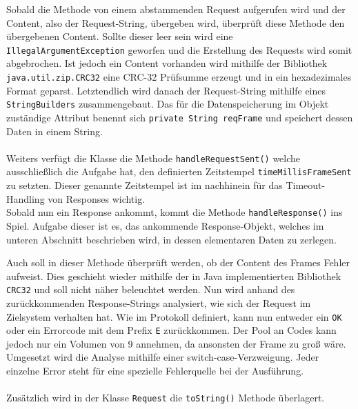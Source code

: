 Sobald die Methode von einem abstammenden Request aufgerufen wird und der Content, also der Request-String, übergeben wird, überprüft diese Methode den übergebenen Content.
Sollte dieser leer sein wird eine \lstinline[style=java]{IllegalArgumentException} geworfen und die Erstellung des Requests wird somit abgebrochen.
Ist jedoch ein Content vorhanden wird mithilfe der Bibliothek \lstinline{java.util.zip.CRC32} eine CRC-32 Prüfsumme erzeugt und in ein hexadezimales Format geparst.
Letztendlich wird danach der Request-String mithilfe eines \lstinline{StringBuilders} zusammengebaut.
Das für die Datenspeicherung im Objekt zuständige Attribut benennt sich \lstinline[style=java]{private String reqFrame} und speichert dessen Daten in einem String.\\\\
Weiters verfügt die Klasse die Methode \lstinline[style=java]{handleRequestSent()} welche ausschließlich die Aufgabe hat, den definierten Zeitstempel \lstinline[style=java]{timeMillisFrameSent} zu setzten.
Dieser genannte Zeitstempel ist im nachhinein für das Timeout-Handling von Responses wichtig.\\
Sobald nun ein Response ankommt, kommt die Methode \lstinline[style=java]{handleResponse()} ins Spiel.
Aufgabe dieser ist es, das ankommende Response-Objekt, welches im unteren Abschnitt beschrieben wird, in dessen elementaren Daten zu zerlegen.

Auch soll in dieser Methode überprüft werden, ob der Content des Frames Fehler aufweist.
Dies geschieht wieder mithilfe der in Java implementierten Bibliothek \lstinline{CRC32} und soll nicht näher beleuchtet werden.
Nun wird anhand des zurückkommenden Response-Strings analysiert, wie sich der Request im Zielsystem verhalten hat.
Wie im Protokoll definiert, kann nun entweder ein \lstinline[style=java]{OK} oder ein Errorcode mit dem Prefix \lstinline[style=java]{E} zurückkommen.
Der Pool an Codes kann jedoch nur ein Volumen von 9 annehmen, da ansonsten der Frame zu groß wäre.
Umgesetzt wird die Analyse mithilfe einer switch-case-Verzweigung.
%
Jeder einzelne Error steht für eine spezielle Fehlerquelle bei der Ausführung.\\\\
Zusätzlich wird in der Klasse \lstinline[style=java]{Request} die \lstinline[style=java]{toString()} Methode überlagert.

